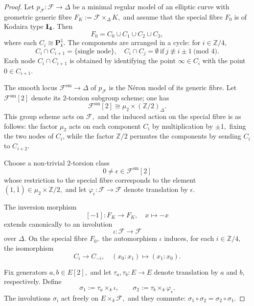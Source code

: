 \documentclass[10pt,a4paper]{amsart}
\newcommand{\Z}{\mathbb{Z}}
\newcommand{\bbP}{\mathbf{P}}
\newcommand{\ca}[1]{{\mathcal{#1}}}
\begin{document}
\begin{proof} Let $p_{\mathcal{F}}\colon\mathcal{F}\to\Delta$ be a minimal regular model of an elliptic curve with geometric generic fibre $F_{K}:=\mathcal{F}\times_{\Delta}K,$ and assume that the special fibre $F_{0}$ is of Kodaira type $\bf{I}_{4}$. Then $$F_{0}=C_{0}\cup C_{1}\cup C_{2}\cup C_{3},$$ where each $C_{i}\cong\bbP^{1}_{k}$. The components are arranged in a cycle: for $i\in\Z/4,$ $$C_{i}\cap C_{i+1}=\{\text{single node}\}, \quad C_{i}\cap C_{j}=\emptyset\ \text{if}\ j\not\equiv i\pm 1\ \text{(mod 4)}.$$
Each node $C_{i}\cap C_{i+1}$ is obtained by identifying the point $\infty\in C_{i}$ with the point $0\in C_{i+1}$.\par
The smooth locus $\mathcal{F}^{\mathrm{sm}}\to\Delta$ of $p_{\mathcal{F}}$ is the N\'eron model of its generic fibre. Let $\mathcal{F}^{\mathrm{sm}}[2]$ denote its $2$-torsion subgroup scheme; one has $$\mathcal{F}^{\mathrm{sm}}[2]\cong\mu_{2}\times(\Z/2)_{\Delta}.$$ This group scheme acts on $\mathcal{F},$ and the induced action on the special fibre is as follows: the factor $\mu_{2}$ acts on each component $C_{i}$ by multiplication by $\pm1,$ fixing the two nodes of $C_{i}$, while the factor $\Z/2$ permutes the components by sending $C_{i}$ to $C_{i+2}$.\par
Choose a non-trivial $2$-torsion class $$0\neq\epsilon\in\mathcal{F}^{\mathrm{sm}}[2]$$ whose restriction to the special fibre corresponds to the element $(1,\bar{1})\in\mu_{2}\times\Z/2,$ and let $\varphi_{\epsilon}\colon \ca F\longrightarrow\ca F$ denote translation by $\epsilon$.\par
The inversion morphism $$[-1]\colon F_{K}\longrightarrow F_{K},\quad x\longmapsto -x$$ extends canonically to an involution
\begin{equation*}
    \iota\colon \ca F\longrightarrow\ca F
\end{equation*}
over $\Delta$. On the special fibre $F_0,$ the automorphism $\iota$ induces, for each $i\in\Z/4,$ the isomorphism $$C_i\longrightarrow C_{-i},\quad (x_{0}:x_{1})\longmapsto (x_{1}:x_{0}).$$\par
Fix generators $a,b\in E[2],$ and let $\tau_{a},\tau_{b}\colon E\to E$ denote translation by $a$ and $b,$ respectively. Define
\begin{equation}\label{eq:inv_bielliptic}
    \sigma_{1}:=\tau_{a}\times_{k}\iota, \qquad 
    \sigma_{2}:=\tau_{b}\times_{k}\varphi_{\epsilon}.
\end{equation}
The involutions $\sigma_{i}$ act freely on $E\times_{k}\ca F,$ and they commute: $\sigma_{1}\circ\sigma_{2}=\sigma_{2}\circ\sigma_{1}$.\par

\end{proof}
\end{document}
